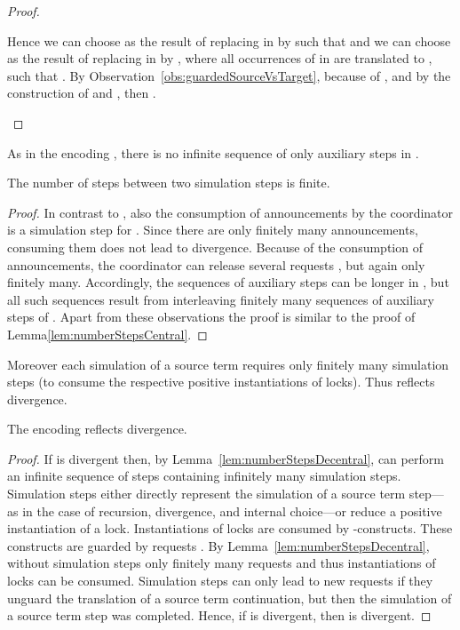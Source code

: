 \documentclass[]{eptcs}
\begin{document}
\begin{proof}
\begin{compactitem}
\begin{compactenum}
					Hence we can choose  as the result of replacing  in  by  such that  and we can choose  as the result of replacing  in  by , where all occurrences of  in  are translated to , such that .
					By Observation~\ref{obs:guardedSourceVsTarget}, because of , and by the construction of  and , then .
			\end{compactenum}
	\end{compactitem}
\end{proof}

As in the encoding , there is no infinite sequence of only auxiliary steps in .

\begin{lemma}
	The number of steps between two simulation steps is finite.
	\label{lem:numberStepsDecentral}
\end{lemma}

\begin{proof}
	In contrast to , also the consumption of announcements by the coordinator is a simulation step for . Since there are only finitely many announcements, consuming them does not lead to divergence. Because of the consumption of announcements, the coordinator can release several requests , but again only finitely many. Accordingly, the sequences of auxiliary steps can be longer in , but all such sequences result from interleaving finitely many sequences of auxiliary steps of .
	Apart from these observations the proof is similar to the proof of Lemma\ref{lem:numberStepsCentral}.
\end{proof}

Moreover each simulation of a source term requires only finitely many simulation steps (to consume the respective positive instantiations of locks). Thus  reflects divergence.

\begin{theorem}
	The encoding  reflects divergence.
	\label{thm:divergenceReflectionDecentral}
\end{theorem}

\begin{proof}
	If  is divergent then, by Lemma~\ref{lem:numberStepsDecentral},  can perform an infinite sequence of steps containing infinitely many simulation steps.
	Simulation steps either directly represent the simulation of a source term step---as in the case of recursion, divergence, and internal choice---or reduce a positive instantiation of a lock.
	Instantiations of locks are consumed by -constructs. These constructs are guarded by requests .
	By Lemma~\ref{lem:numberStepsDecentral}, without simulation steps only finitely many requests and thus instantiations of locks can be consumed. Simulation steps can only lead to new requests if they unguard the translation of a source term continuation, but then the simulation of a source term step was completed.
	Hence, if  is divergent, then  is divergent.
\end{proof}
\end{document}
